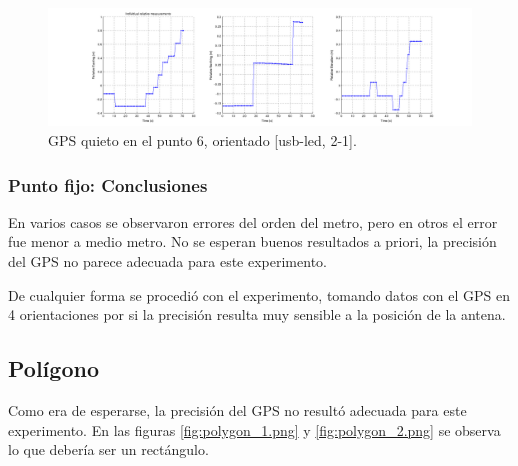 \documentclass[spanish,12pt,a4paper,titlepage]{report}
\begin{document}
\newpage

\begin{figure}[h!]
  \hspace{-70pt}
  \includegraphics[width=1.3\textwidth]{./img/log_05_individual.png}
  \caption{GPS quieto en el punto 6, orientado [usb-led, 2-1].}
  \label{fig:log_05_individual.png}
\end{figure}

\subsubsection{Punto fijo: Conclusiones}
\label{sec:punto-fijo-conclusiones}

En varios casos se observaron errores del orden del metro, pero en otros el error fue menor a medio metro. No se esperan buenos resultados a priori, la precisión del GPS no parece adecuada para este experimento.

De cualquier forma se procedió con el experimento, tomando datos con el GPS en 4 orientaciones por si la precisión resulta muy sensible a la posición de la antena.

\newpage
\subsection{Polígono}
\label{sec:poligono}

Como era de esperarse, la precisión del GPS no resultó adecuada para este experimento. En las figuras \ref{fig:polygon_1.png} y \ref{fig:polygon_2.png} se observa lo que debería ser un rectángulo.
\end{document}
